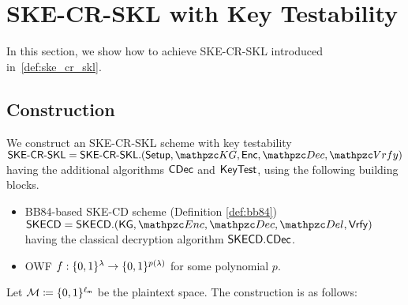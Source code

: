 
\section{SKE-CR-SKL with Key Testability}\label{sec:SKECRSKL-KT}
In this section, we show how to achieve SKE-CR-SKL introduced in~\cref{def:ske_cr_skl}.
\subsection{Construction}\label{sec:SKECRSKL-KT-construction}
We construct an SKE-CR-SKL scheme with key testability $\SKECRSKL=
\SKECRSKL.(\Setup,\qKG,\Enc,\qDec,\allowbreak\qVrfy)$ having the
additional algorithms $\mathsf{CDec}$ and $\mathsf{KeyTest}$, using the
following building blocks.

\begin{itemize}
\item BB84-based SKE-CD scheme (Definition \ref{def:bb84}) $\SKECD =
\SKECD.(\KG,\qEnc,\qDec,\allowbreak\qDel,\Vrfy)$ having the classical
decryption algorithm $\mathsf{SKECD}.\mathsf{CDec}$.

\item OWF $f:\{0,1\}^\lambda\rightarrow\{0,1\}^{p(\lambda)}$ for some polynomial $p$.
\end{itemize}

Let $\mathcal{M} \coloneqq \{0,1\}^{\ell_{\mathsf{m}}}$ be the plaintext space. The construction is as follows:

